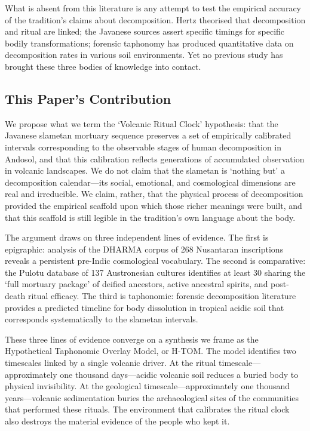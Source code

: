 \documentclass[12pt,a4paper]{article}
\begin{document}
What is absent from this literature is any attempt to test the empirical accuracy of the tradition's claims about decomposition. Hertz theorised that decomposition and ritual are linked; the Javanese sources assert specific timings for specific bodily transformations; forensic taphonomy has produced quantitative data on decomposition rates in various soil environments. Yet no previous study has brought these three bodies of knowledge into contact.

\subsection{This Paper's Contribution}

We propose what we term the `Volcanic Ritual Clock' hypothesis: that the Javanese slametan mortuary sequence preserves a set of empirically calibrated intervals corresponding to the observable stages of human decomposition in Andosol, and that this calibration reflects generations of accumulated observation in volcanic landscapes. We do not claim that the slametan is `nothing but' a decomposition calendar---its social, emotional, and cosmological dimensions are real and irreducible. We claim, rather, that the physical process of decomposition provided the empirical scaffold upon which those richer meanings were built, and that this scaffold is still legible in the tradition's own language about the body.

The argument draws on three independent lines of evidence. The first is epigraphic: analysis of the DHARMA corpus of 268 Nusantaran inscriptions reveals a persistent pre-Indic cosmological vocabulary. The second is comparative: the Pulotu database of 137 Austronesian cultures identifies at least 30 sharing the `full mortuary package' of deified ancestors, active ancestral spirits, and post-death ritual efficacy. The third is taphonomic: forensic decomposition literature provides a predicted timeline for body dissolution in tropical acidic soil that corresponds systematically to the slametan intervals.

These three lines of evidence converge on a synthesis we frame as the Hypothetical Taphonomic Overlay Model, or H-TOM. The model identifies two timescales linked by a single volcanic driver. At the ritual timescale---approximately one thousand days---acidic volcanic soil reduces a buried body to physical invisibility. At the geological timescale---approximately one thousand years---volcanic sedimentation buries the archaeological sites of the communities that performed these rituals. The environment that calibrates the ritual clock also destroys the material evidence of the people who kept it.
\end{document}

